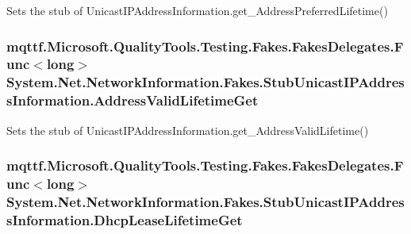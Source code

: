 Sets the stub of Unicast\-I\-P\-Address\-Information.\-get\-\_\-\-Address\-Preferred\-Lifetime()

\hypertarget{class_system_1_1_net_1_1_network_information_1_1_fakes_1_1_stub_unicast_i_p_address_information_a878d404c07c3aad4f8779400b3b54c3d}{
\subsubsection[{Address\-Valid\-Lifetime\-Get}]{\setlength{\rightskip}{0pt plus 5cm}mqttf.\-Microsoft.\-Quality\-Tools.\-Testing.\-Fakes.\-Fakes\-Delegates.\-Func$<$long$>$ System.\-Net.\-Network\-Information.\-Fakes.\-Stub\-Unicast\-I\-P\-Address\-Information.\-Address\-Valid\-Lifetime\-Get}}\label{class_system_1_1_net_1_1_network_information_1_1_fakes_1_1_stub_unicast_i_p_address_information_a878d404c07c3aad4f8779400b3b54c3d}


Sets the stub of Unicast\-I\-P\-Address\-Information.\-get\-\_\-\-Address\-Valid\-Lifetime()

\hypertarget{class_system_1_1_net_1_1_network_information_1_1_fakes_1_1_stub_unicast_i_p_address_information_a6f40c0a896b1f81c21ead1587b63df53}{
\subsubsection[{Dhcp\-Lease\-Lifetime\-Get}]{\setlength{\rightskip}{0pt plus 5cm}mqttf.\-Microsoft.\-Quality\-Tools.\-Testing.\-Fakes.\-Fakes\-Delegates.\-Func$<$long$>$ System.\-Net.\-Network\-Information.\-Fakes.\-Stub\-Unicast\-I\-P\-Address\-Information.\-Dhcp\-Lease\-Lifetime\-Get}}\label{class_system_1_1_net_1_1_network_information_1_1_fakes_1_1_stub_unicast_i_p_address_information_a6f40c0a896b1f81c21ead1587b63df53}


